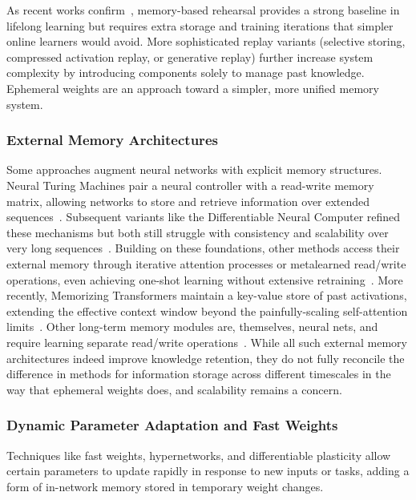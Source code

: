 As recent works confirm~\cite{Forgetting_Survey_2024}, memory-based rehearsal provides a strong baseline in lifelong learning but requires extra storage and training iterations that simpler online learners would avoid. More sophisticated replay variants (selective storing, compressed activation replay, or generative replay) further increase system complexity by introducing components solely to manage past knowledge. Ephemeral weights are an approach toward a simpler, more unified memory system.

\subsubsection{External Memory Architectures}
Some approaches augment neural networks with explicit memory structures. Neural Turing Machines pair a neural controller with a read-write memory matrix, allowing networks to store and retrieve information over extended sequences~\cite{Graves2014NeuralTM}. Subsequent variants like the Differentiable Neural Computer refined these mechanisms but both still struggle with consistency and scalability over very long sequences~\cite{graves_hybrid_2016}. Building on these foundations, other methods access their external memory through iterative attention processes or metalearned read/write operations, even achieving one-shot learning without extensive retraining~\cite{santoroMetaLearningMemoryAugmentedNeural2016,westonMemoryNetworks2014}. More recently, Memorizing Transformers maintain a key-value store of past activations, extending the effective context window beyond the painfully-scaling self-attention limits~\cite{wuMemorizingTransformers2022}. Other long-term memory modules are, themselves, neural nets, and require learning separate read/write operations~\cite{wangAugmentingLanguageModels2023}. While all such external memory architectures indeed improve knowledge retention, they do not fully reconcile the difference in methods for information storage across different timescales in the way that ephemeral weights does, and scalability remains a concern.

\subsubsection{Dynamic Parameter Adaptation and Fast Weights}

Techniques like fast weights, hypernetworks, and differentiable plasticity allow certain parameters to update rapidly in response to new inputs or tasks, adding a form of in-network memory stored in temporary weight changes.

